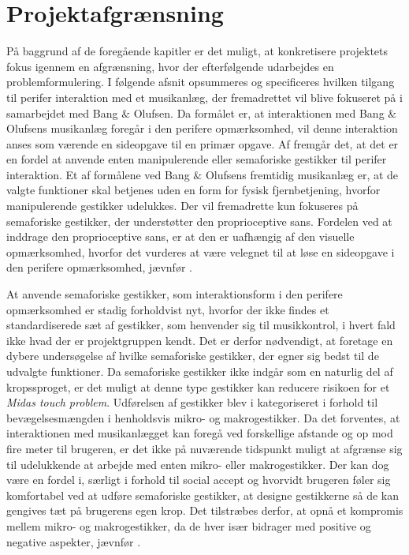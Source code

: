 \chapter{Projektafgrænsning}
\label{Afgraensning}
%
På baggrund af de foregående kapitler er det muligt, at konkretisere projektets fokus igennem en afgrænsning, hvor der efterfølgende udarbejdes en problemformulering. I følgende afsnit opsummeres og specificeres hvilken tilgang til perifer interaktion med et musikanlæg, der fremadrettet vil blive fokuseret på i samarbejdet med Bang $\&$ Olufsen.\blankline
%
Da formålet er, at interaktionen med Bang $\&$ Olufsens musikanlæg foregår i den perifere opmærksomhed, vil denne interaktion anses som værende en sideopgave til en primær opgave. Af  fremgår det, at det er en fordel at anvende enten manipulerende eller semaforiske gestikker til perifer interaktion. Et af formålene ved Bang $\&$ Olufsens fremtidig musikanlæg er, at de valgte funktioner skal betjenes uden en form for fysisk fjernbetjening, hvorfor manipulerende gestikker udelukkes. Der vil fremadrette kun fokuseres på semaforiske gestikker, der understøtter den proprioceptive sans. Fordelen ved at inddrage den proprioceptive sans, er at den er uafhængig af den visuelle opmærksomhed, hvorfor det vurderes at være velegnet til at løse en sideopgave i den perifere opmærksomhed, jævnfør .     

At anvende semaforiske gestikker, som interaktionsform i den perifere opmærksomhed er stadig forholdvist nyt, hvorfor der ikke findes et standardiserede sæt af gestikker, som henvender sig til musikkontrol, i hvert fald ikke hvad der er projektgruppen kendt. Det er derfor nødvendigt, at foretage en dybere undersøgelse af hvilke semaforiske gestikker, der egner sig bedst til de udvalgte funktioner. Da semaforiske gestikker ikke indgår som en naturlig del af kropssproget, er det muligt at denne type gestikker kan reducere risikoen for et \textit{Midas touch problem}.\blankline
%
Udførelsen af gestikker blev i  kategoriseret i forhold til bevægelsesmængden i henholdsvis mikro- og makrogestikker. Da det forventes, at interaktionen med musikanlægget kan foregå ved forskellige afstande og op mod fire meter til brugeren, er det ikke på nuværende tidspunkt muligt at afgrænse sig til udelukkende at arbejde med enten mikro- eller makrogestikker. Der kan dog være en fordel i, særligt i forhold til social accept og hvorvidt brugeren føler sig komfortabel ved at udføre semaforiske gestikker, at designe gestikkerne så de kan gengives tæt på brugerens egen krop. Det tilstræbes derfor, at opnå et kompromis mellem mikro- og makrogestikker, da de hver især bidrager med positive og negative aspekter, jævnfør .

